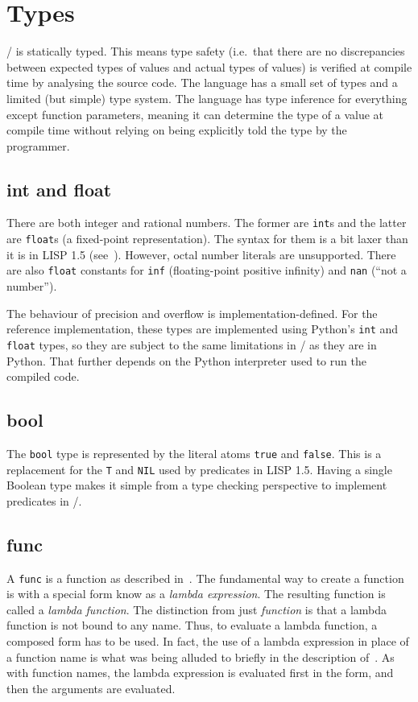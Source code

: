 \documentclass[a4paper, 12pt]{article}
\begin{document}
\section{Types}
\lispy/ is statically typed. This means type safety (i.e.\ that there are no discrepancies between expected types of values and actual types of values) is verified at compile time by analysing the source code. The language has  a small set of types and a limited (but simple) type system. The language has type inference for everything except function parameters, meaning it can determine the type of a value at compile time without relying on being explicitly told the type by the programmer.

\subsection{int and float}
There are both integer and rational numbers. The former are \texttt{int}s and the latter are \texttt{float}s (a fixed-point representation). The syntax for them is a bit laxer than it is in LISP 1.5 (see~). However, octal number literals are unsupported. There are also \texttt{float} constants for \texttt{inf} (floating-point positive infinity) and \texttt{nan} (``not a number'').

The behaviour of precision and overflow is implementation-defined. For the reference implementation, these types are implemented using Python's \texttt{int} and \texttt{float} types, so they are subject to the same limitations in \lispy/ as they are in Python. That further depends on the Python interpreter used to run the compiled code.

\subsection{bool}
The \texttt{bool} type is represented by the literal atoms \texttt{true} and \texttt{false}. This is a replacement for the \texttt{T} and \texttt{NIL} used by predicates in LISP 1.5. Having a single Boolean type makes it simple from a type checking perspective to implement predicates in \lispy/.

\subsection{func} \label{subsec:func}
A \texttt{func} is a function as described in~. The fundamental way to create a function is with a special form know as a \textit{lambda expression}. The resulting function is called a \textit{lambda function}. The distinction from just \textit{function} is that a lambda function is not bound to any name. Thus, to evaluate a lambda function, a composed form has to be used. In fact, the use of a lambda expression in place of a function name is what was being alluded to briefly in the description of~. As with function names, the lambda expression is evaluated first in the form, and then the arguments are evaluated.
\end{document}
